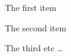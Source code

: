 \documentclass{article}
\begin{document}
     \begin{list_type}  
         \item The first item 
         \item The second item 
         \item The third etc \ldots 
     \end{list_type}
\end{document}
